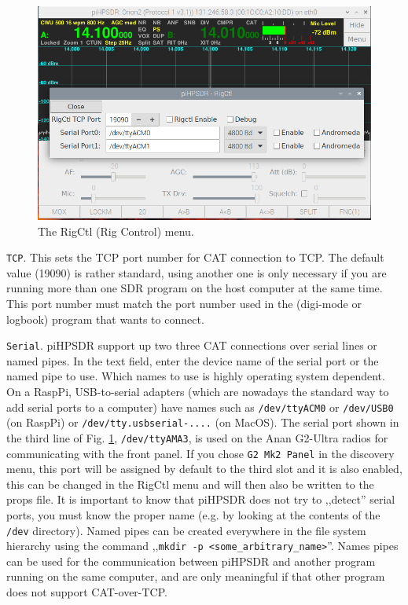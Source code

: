 \documentclass[12pt]{book}
\def\rett#1{\texttt{\color{red}#1}}
\def\pH{pi\-HPSDR }
\begin{document}
\begin{figure}[ht]
\center
\includegraphics[width=12cm]{RigCtlMenu.png}
\caption{The RigCtl (Rig Control) menu.}
\label{fig:RigCtlMenu}
\end{figure}

\rett{TCP}. This sets the TCP port number for CAT connection to TCP. The default value (19090)
is rather standard, using another one is only necessary if you are running more than one
SDR program on the host computer at the same time.
This port number must match the port number used in the (digi-mode or logbook) program that wants to connect.

\rett{Serial}. \pH support up two three CAT connections over serial lines or named pipes.
In the text field, enter the device name of the serial port or the named pipe to use.
Which names to use
is highly operating system dependent. On a RaspPi,  USB-to-serial
adapters (which are nowadays the standard way to add serial ports to a computer) have names such as
\texttt{/dev/ttyACM0} or \texttt{/dev/USB0} (on RaspPi) or \texttt{/dev/tty.usbserial-....} (on MacOS).
The serial port shown in the third line of Fig. \ref{fig:RigCtlMenu}, \texttt{/dev/ttyAMA3},
is used on the Anan G2-Ultra radios for communicating with the front panel. If you chose
\rett{G2 Mk2 Panel} in the discovery menu, this port will be assigned by default to the third
slot and it is also enabled, this can be changed in the RigCtl menu and will then also be written to
the props file.
 It is important to know that \pH does not try to ,,detect'' serial
ports, you must know the proper name (e.g. by looking at the contents of the \texttt{/dev} directory).
Named pipes can be created everywhere in the file system hierarchy using the command
,,\texttt{mkdir -p <some\_arbitrary\_name>}''. Names pipes can be used for the communication between \pH
and another program running on the same computer, and are only meaningful if that other program does not
support CAT-over-TCP.
\end{document}
